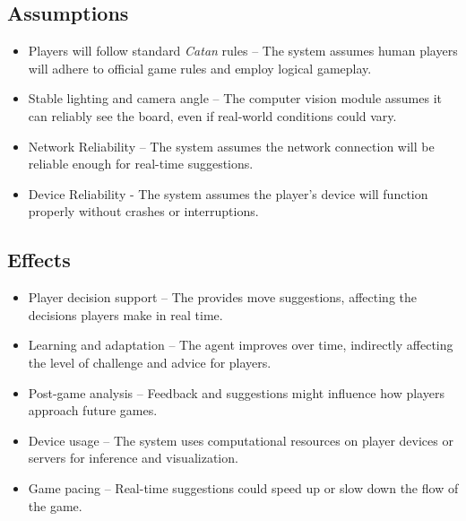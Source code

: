 \documentclass{article}
\begin{document}
\subsection{Assumptions}\label{subsec:assumptions}
\begin{itemize}
    \item {Players will follow standard \emph{Catan{}} rules} – The system assumes human players will adhere to official game rules and employ logical gameplay.
    \item {Stable lighting and camera angle} – The computer vision module assumes it can reliably see the board, even if real-world conditions could vary.
    \item {Network Reliability} – The system assumes the network connection will be reliable enough for real-time suggestions.
    \item {Device Reliability} - The system assumes the player’s device will function properly without crashes or interruptions.
\end{itemize}

\subsection{Effects}\label{subsec:effects}
\begin{itemize}
    \item {Player decision support} – The \AI{} provides move suggestions, affecting the decisions players make in real time.
    \item {Learning and adaptation} – The \RL{} agent improves over time, indirectly affecting the level of challenge and advice for players.
    \item {Post-game analysis} – Feedback and suggestions might influence how players approach future games.
    \item {Device usage} – The system uses computational resources on player devices or servers for inference and visualization.
    \item {Game pacing} – Real-time suggestions could speed up or slow down the flow of the game.
\end{itemize}
\end{document}

